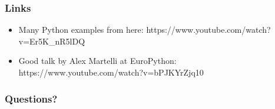 \documentclass{beamer}
\begin{document}
\begin{frame}
\frametitle{Links}

  \begin{itemize}
   \item Many Python examples from here: https://www.youtube.com/watch?v=Er5K\_nR5lDQ
   \item Good talk by Alex Martelli at EuroPython: https://www.youtube.com/watch?v=bPJKYrZjq10
  \end{itemize}

\end{frame}

 \begin{frame}
 \frametitle{Questions?}
 \begin{center}
 \end{center}
 \end{frame}
\end{document}
